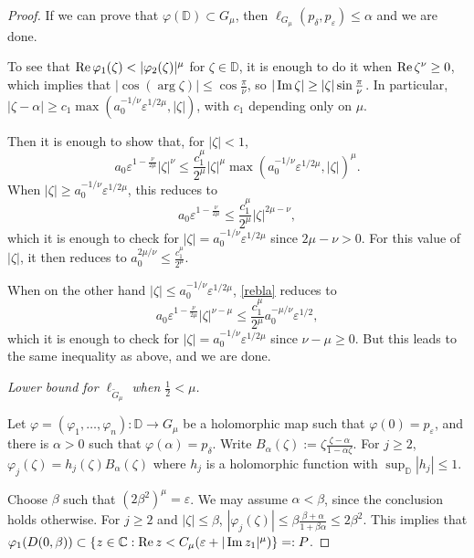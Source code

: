 \documentclass[a4paper,12pt]{amsart}
\def\D{\mathbb D}
\def\C{\mathbb C}
\renewcommand{\Im}{\operatorname{\rm{Im}}}
\renewcommand{\Re}{\operatorname{\rm{Re}}}
\newcommand{\eps}{\varepsilon}
\begin{document}
\begin{proof}
If we can prove that $\varphi(\D)\subset G_\mu$, then $\ell_{ G_\mu}(p_\delta, p_\eps) \le \alpha$ and we are done.

To see that $\Re \varphi_1(\zeta) < |\varphi_2(\zeta)|^\mu$ for $\zeta \in \D$, 
it is enough to do it when $\Re \zeta^\nu \ge 0$, which implies that 
$|\cos (\arg \zeta)| \le \cos \frac\pi\nu$, 
so $|\Im \zeta| \ge |\zeta| \sin \frac\pi\nu$.
In particular, 
$|\zeta-\alpha|\ge c_1 \max (a_0^{-1/\nu} \eps^{1/2\mu}, |\zeta|)$,
with $c_1$ depending only on $\mu$. 

Then it is enough to show that, for $|\zeta|<1$,
\begin{equation}
\label{rebla}
a_0 \eps^{1-\frac\nu{2\mu}} |\zeta|^\nu 
\le \frac{c_1^\mu}{2^\mu} |\zeta|^\mu \max (a_0^{-1/\nu} \eps^{1/2\mu}, |\zeta|)^\mu.
\end{equation}
When $|\zeta| \ge a_0^{-1/\nu} \eps^{1/2\mu}$, this reduces to
\[
a_0 \eps^{1-\frac\nu{2\mu}} \le \frac{c_1^\mu}{2^\mu} |\zeta|^{2\mu-\nu},
\]
which it is enough to check for $|\zeta| = a_0^{-1/\nu} \eps^{1/2\mu}$
since $2\mu-\nu>0$. For this value of $|\zeta|$, it then reduces to 
$a_0^{2\mu/\nu}\le \frac{c_1^\mu}{2^\mu}$. 

When on the other hand $|\zeta| \le a_0^{-1/\nu} \eps^{1/2\mu}$, 
\eqref{rebla} reduces to 
\[
a_0 \eps^{1-\frac\nu{2\mu}} |\zeta|^{\nu-\mu} \le \frac{c_1^\mu}{2^\mu} 
 a_0^{-\mu/\nu} \eps^{1/2},
\]
which it is enough to check for $|\zeta| = a_0^{-1/\nu} \eps^{1/2\mu}$
since $\nu-\mu\ge 0$. But this leads to the same inequality as above, and 
we are done.
\vskip1cm


\smallskip

{\it Lower bound for $\ell_{\tilde G_\mu}$ when $\frac12 < \mu$.}


Let $\varphi=(\varphi_1, \dots, \varphi_n): \D \longrightarrow G_\mu$ be a holomorphic map such that $\varphi (0)=  p_\eps$,
and there is $\alpha>0$ such that $\varphi(\alpha)= p_\delta$. Write $B_\alpha (\zeta):= \zeta \frac{\zeta-\alpha}{1-\alpha \zeta}$.
For $j\ge 2$, $\varphi_j(\zeta) = h_j(\zeta) B_\alpha (\zeta)$ where $h_j$ is a holomorphic function with $\sup_{\D} |h_j| \le 1$.

Choose  $\beta$ such that $(2\beta^2)^\mu=  \eps$.
We may assume $\alpha <\beta$,
since the conclusion holds otherwise. For $j\ge 2$ and $|\zeta|\le \beta$,
$|\varphi_j(\zeta)| \le \beta \frac{\beta+\alpha}{1+\beta \alpha}
\le 2 \beta^2$. This implies that $\varphi_1 (D(0,\beta))
\subset \{ z \in \C: \Re z < C_\mu (\eps+|\Im z_1|^{\mu})\}=:P$.


\end{proof}
\end{document}
